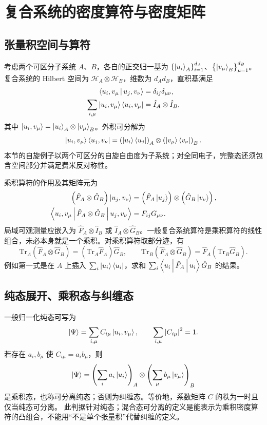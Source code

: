 \section{复合系统的密度算符与密度矩阵}
\subsection{张量积空间与算符}
考虑两个可区分子系统 $A$、$B$，各自的正交归一基为
$\left\{\Ket{u_i}_A\right\}_{i=1}^{d_A}$、$\left\{\Ket{v_\mu}_B\right\}_{\mu=1}^{d_B}$。
复合系统的 Hilbert 空间为 $\mathcal H_A\otimes\mathcal H_B$，维数为 $d_Ad_B$，直积基满足
\begin{align}
\Braket{u_i,v_\mu|u_j,v_\nu}&=\delta_{ij}\delta_{\mu\nu},\\
\sum_{i,\mu}\Ket{u_i,v_\mu}\Bra{u_i,v_\mu}
&=\hat I_A\otimes\hat I_B,
\end{align}
其中 $\Ket{u_i,v_\mu}=\Ket{u_i}_A\otimes\Ket{v_\mu}_B$。外积可分解为
\begin{equation}
\Ket{u_i,v_\mu}\Bra{u_j,v_\nu}
=\left(\Ket{u_i}\Bra{u_j}\right)_A\otimes
\left(\Ket{v_\mu}\Bra{v_\nu}\right)_B.
\end{equation}
本节的自旋例子以两个可区分的自旋自由度为子系统；对全同电子，完整态还须包含空间部分并满足费米反对称性。

乘积算符的作用及其矩阵元为
\begin{align}
\left(\hat F_A\otimes\hat G_B\right)\Ket{u_j,v_\nu}
&=\left(\hat F_A\Ket{u_j}\right)\otimes\left(\hat G_B\Ket{v_\nu}\right),\\
\Braket{u_i,v_\mu|\hat F_A\otimes\hat G_B|u_j,v_\nu}
&=F_{ij}G_{\mu\nu}.
\end{align}
局域可观测量应嵌入为 $\hat F_A\otimes\hat I_B$ 或 $\hat I_A\otimes\hat G_B$。一般复合系统算符是乘积算符的线性组合，未必本身就是一个乘积。对乘积算符取部分迹，有
\begin{equation}
\mathrm{Tr}_A\left(\hat F_A\otimes\hat G_B\right)
=\left(\mathrm{Tr}_A\hat F_A\right)\hat G_B,
\qquad
\mathrm{Tr}_B\left(\hat F_A\otimes\hat G_B\right)
=\hat F_A\left(\mathrm{Tr}_B\hat G_B\right).
\end{equation}
例如第一式是在 $A$ 上插入 $\sum_i\Ket{u_i}\Bra{u_i}$，求和
$\sum_i\Braket{u_i|\hat F_A|u_i}\hat G_B$ 的结果。

\subsection{纯态展开、乘积态与纠缠态}
一般归一化纯态可写为
\begin{equation}
\Ket{\Psi}=\sum_{i,\mu}C_{i\mu}\Ket{u_i,v_\mu},\qquad
\sum_{i,\mu}\left|C_{i\mu}\right|^2=1.
\end{equation}
若存在 $a_i,b_\mu$ 使 $C_{i\mu}=a_ib_\mu$，则
\begin{equation}
\Ket{\Psi}=\left(\sum_i a_i\Ket{u_i}\right)_A\otimes
\left(\sum_\mu b_\mu\Ket{v_\mu}\right)_B
\end{equation}
是乘积态，也称可分离纯态；否则为纠缠态。等价地，系数矩阵 $C$ 的秩为一时且仅当纯态可分离。
此判据针对纯态；混合态可分离的定义是能表示为乘积密度算符的凸组合，不能用“不是单个张量积”代替纠缠的定义。

